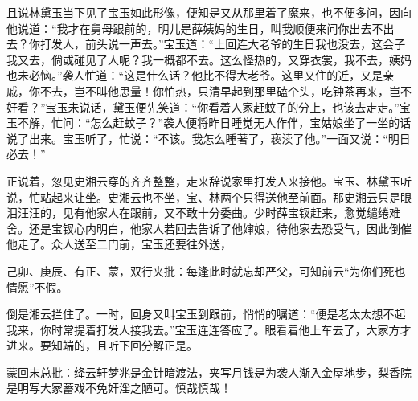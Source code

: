 \begin{parag}


    且说林黛玉当下见了宝玉如此形像，便知是又从那里着了魔来，也不便多问，因向他说道：“我才在舅母跟前的，明儿是薛姨妈的生日，叫我顺便来问你出去不出去？你打发人，前头说一声去。”宝玉道：“上回连大老爷的生日我也没去，这会子我又去，倘或碰见了人呢？我一概都不去。这么怪热的，又穿衣裳，我不去，姨妈也未必恼。”袭人忙道：“这是什么话？他比不得大老爷。这里又住的近，又是亲戚，你不去，岂不叫他思量！你怕热，只清早起到那里磕个头，吃钟茶再来，岂不好看？”宝玉未说话，黛玉便先笑道：“你看着人家赶蚊子的分上，也该去走走。”宝玉不解，忙问：“怎么赶蚊子？”袭人便将昨日睡觉无人作伴，宝姑娘坐了一坐的话说了出来。宝玉听了，忙说：“不该。我怎么睡著了，亵渎了他。”一面又说：“明日必去！”
\end{parag}


\begin{parag}


    正说着，忽见史湘云穿的齐齐整整，走来辞说家里打发人来接他。宝玉、林黛玉听说，忙站起来让坐。史湘云也不坐，宝、林两个只得送他至前面。那史湘云只是眼泪汪汪的，见有他家人在跟前，又不敢十分委曲。少时薛宝钗赶来，愈觉缱绻难舍。还是宝钗心内明白，他家人若回去告诉了他婶娘，待他家去恐受气，因此倒催他走了。众人送至二门前，宝玉还要往外送，\begin{note}己卯、庚辰、有正、蒙，双行夹批：每逢此时就忘却严父，可知前云“为你们死也情愿”不假。\end{note}倒是湘云拦住了。一时，回身又叫宝玉到跟前，悄悄的嘱道：“便是老太太想不起我来，你时常提着打发人接我去。”宝玉连连答应了。眼看着他上车去了，大家方才进来。要知端的，且听下回分解正是。
\end{parag}

\begin{parag}

    \begin{note}蒙回末总批：绛云轩梦兆是金针暗渡法，夹写月钱是为袭人渐入金屋地步，梨香院是明写大家蓄戏不免奸淫之陋可。慎哉慎哉！\end{note}
\end{parag}

